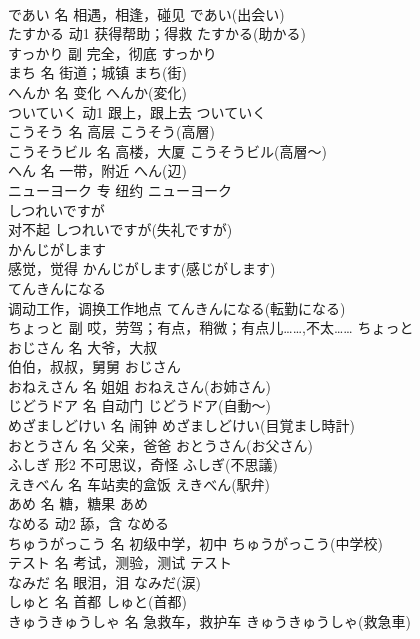 \documentclass[8pt]{extreport}
\begin{document}
\begin{CJK}{UTF8}{min}
\\	であい	名	相遇，相逢，碰见	であい(出会い)	
\\	たすかる	动1	获得帮助；得救	たすかる(助かる)	
\\	すっかり	副	完全，彻底	すっかり	
\\	まち	名	街道；城镇	まち(街)	
\\	へんか	名	变化	へんか(変化)	
\\	ついていく	动1	跟上，跟上去	ついていく	
\\	こうそう	名	高层	こうそう(高層)	
\\	こうそうビル	名	高楼，大厦	こうそうビル(高層～)	
\\	へん	名	一带，附近	へん(辺)	
\\	ニューヨーク	专	纽约	ニューヨーク	
\\	しつれいですが	
\\	对不起	しつれいですが(失礼ですが)	
\\	かんじがします	
\\	感觉，觉得	かんじがします(感じがします)	
\\	てんきんになる	
\\	调动工作，调换工作地点	てんきんになる(転勤になる)	
\\	ちょっと	副	哎，劳驾；有点，稍微；有点儿……,不太……	ちょっと	
\\	おじさん	名	大爷，大叔 
\\	伯伯，叔叔，舅舅	おじさん	
\\	おねえさん	名	姐姐	おねえさん(お姉さん)	
\\	じどうドア	名	自动门	じどうドア(自動～)	
\\	めざましどけい	名	闹钟	めざましどけい(目覚まし時計)	
\\	おとうさん	名	父亲，爸爸	おとうさん(お父さん)	
\\	ふしぎ	形2	不可思议，奇怪	ふしぎ(不思議)	
\\	えきべん	名	车站卖的盒饭	えきべん(駅弁)	
\\	あめ	名	糖，糖果	あめ	
\\	なめる	动2	舔，含	なめる	
\\	ちゅうがっこう	名	初级中学，初中	ちゅうがっこう(中学校)	
\\	テスト	名	考试，测验，测试	テスト	
\\	なみだ	名	眼泪，泪	なみだ(涙)	
\\	しゅと	名	首都	しゅと(首都)	
\\	きゅうきゅうしゃ	名	急救车，救护车	きゅうきゅうしゃ(救急車)	

\end{CJK}
\end{document}
